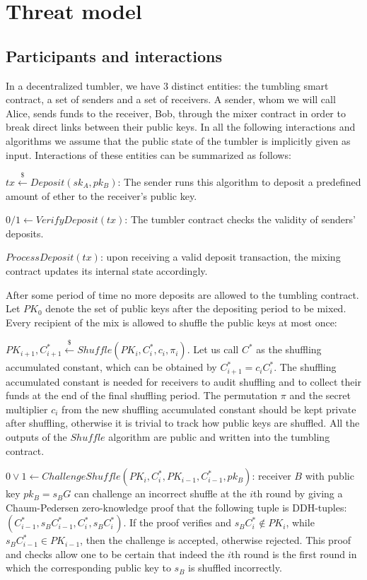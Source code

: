 \documentclass[a4paper]{article}
\theoremstyle{definition}
\begin{document}
\section{Threat model}
\subsection{Participants and interactions}
In a decentralized tumbler, we have $3$ distinct entities: the tumbling smart contract, a set of senders and a set of receivers. A sender, whom we will call Alice, sends funds to the receiver, Bob, through the mixer contract in order to break direct links between their public keys. In all the following interactions and algorithms we assume that the public state of the tumbler is implicitly given as input. Interactions of these entities can be summarized as follows: 
 
$tx\stackrel{\$}{\leftarrow}Deposit(sk_A,pk_B)$: The sender runs this algorithm to deposit a predefined amount of ether to the receiver's public key.

$0/1\leftarrow VerifyDeposit(tx)$: The tumbler contract checks the validity of senders' deposits.

$ProcessDeposit(tx)$: upon receiving a valid deposit transaction, the mixing contract updates its internal state accordingly.

After some period of time no more deposits are allowed to the tumbling contract. Let $PK_{0}$ denote the set of public keys after the depositing period to be mixed. Every recipient of the mix is allowed to shuffle the public keys at most once: 

$PK_{i+1},C_{i+1}^{*}\stackrel{\$}{\leftarrow}Shuffle(PK_{i},C^{*}_{i},c_{i},\pi_{i})$. Let us call $C^{*}$ as the shuffling accumulated constant, which can be obtained by $C^{*}_{i+1}=c_{i}C^{*}_{i}$. The shuffling accumulated constant is needed for receivers to audit shuffling and to collect their funds at the end of the final shuffling period. The permutation $\pi$ and the secret multiplier $c_{i}$ from the new shuffling accumulated constant should be kept private after shuffling, otherwise it is trivial to track how public keys are shuffled. All the outputs of the $Shuffle$ algorithm are public and written into the tumbling contract.  

$0\lor1\leftarrow 
ChallengeShuffle(PK_{i},C^{*}_{i},PK_{i-1},C^{*}_{i-1},pk_{B})$: receiver $B$ with public key $pk_{B}=s_{B}G$ can challenge an incorrect shuffle at the $i$th round by giving a Chaum-Pedersen zero-knowledge proof that the following tuple is DDH-tuples: $(C^{*}_{i-1}, s_{B}C^{*}_{i-1}, C^{*}_{i}, s_{B}C^{*}_{i})$. If the proof verifies and $s_{B}C^{*}_{i} \notin PK_{i}$, while $s_{B}C^{*}_{i-1} \in PK_{i-1}$, then the challenge is accepted, otherwise rejected. This proof and checks allow one to be certain that indeed the $i$th round is the first round in which the corresponding public key to $s_{B}$ is shuffled incorrectly.  
\end{document}

